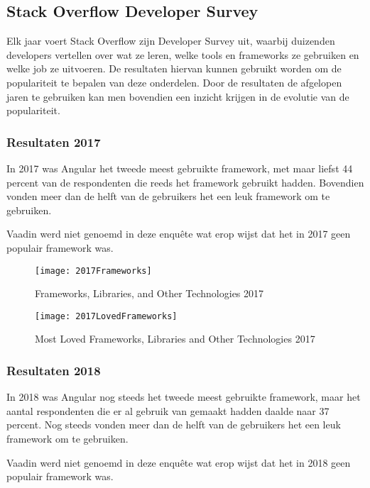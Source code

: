 \subsection{Stack Overflow Developer Survey}
Elk jaar voert Stack Overflow zijn Developer Survey \autocite{DeveloperSurvey2019} uit, waarbij duizenden developers vertellen over wat ze leren, welke tools en frameworks ze gebruiken en welke job ze uitvoeren. De resultaten hiervan kunnen gebruikt worden om de populariteit te bepalen van deze onderdelen. Door de resultaten de afgelopen jaren te gebruiken kan men bovendien een inzicht krijgen in de evolutie van de populariteit.


\subsubsection{Resultaten 2017}
In 2017 was Angular het tweede meest gebruikte framework, met maar liefst 44 percent van de respondenten die reeds het framework gebruikt hadden. Bovendien vonden meer dan de helft van de gebruikers het een leuk framework om te gebruiken.

Vaadin werd niet genoemd in deze enquête wat erop wijst dat het in 2017 geen populair framework was.

\begin{figure}[H]
	\centering
	\texttt{[image: 2017Frameworks]}
	\caption{Frameworks, Libraries, and Other Technologies 2017 \autocite{DeveloperSurvey2017}}
	\label{fig:Frameworks, Libraries, and Other Technologies 2017}
\end{figure}

\begin{figure}[H]
	\centering
	\texttt{[image: 2017LovedFrameworks]}
	\caption{Most Loved Frameworks, Libraries and Other Technologies 2017 \autocite{DeveloperSurvey2017}}
	\label{fig:Most Loved Frameworks, Libraries and Other Technologies 2017}
\end{figure}

\subsubsection{Resultaten 2018}
In 2018 was Angular nog steeds het tweede meest gebruikte framework, maar het aantal respondenten die er al gebruik van gemaakt hadden daalde naar 37 percent. Nog steeds vonden meer dan de helft van de gebruikers het een leuk framework om te gebruiken.

Vaadin werd niet genoemd in deze enquête wat erop wijst dat het in 2018 geen populair framework was.

